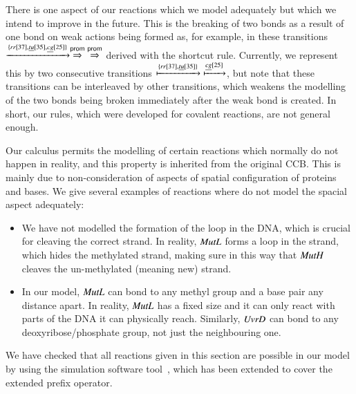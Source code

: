 There is one aspect of our reactions which we model adequately but which we intend to improve in the future. This is the breaking of two bonds as a result of one bond on weak actions being formed as, for example, in these transitions   $\xrightarrow{\{rr[37],\underline{tu}[35],\underline{cg}[25]\}}
\overset{ \textsf{prom}}\Rightarrow \; \overset{ \textsf{prom}}\Rightarrow$ derived with the  shortcut   rule. Currently, we represent this
by two consecutive transitions $\xmapsto{\{rr[37],\underline{tu}[35]\}}\; \xmapsto{\underline{cg}[25]}$, but note 
that these transitions can be interleaved by other transitions, which weakens the modelling of the two bonds being broken immediately after the weak bond is created. In short, our  rules, which were developed for covalent reactions, are not general enough.


Our calculus permits the modelling of certain reactions which normally do not happen in reality, and this property is inherited from the original CCB. This is mainly due to non-consideration of aspects of spatial configuration of proteins and bases. We give several examples of reactions where do not model the spacial aspect adequately: 
\begin{itemize}
\item We have not modelled the formation of the loop in the DNA, which is crucial for cleaving the correct strand. In reality, 
$\mathit{MutL}$ forms a loop in the strand, which hides the methylated strand, making sure in this way that $\mathit{MutH}$ cleaves the un-methylated (meaning new) strand.
\item In our model, $\mathit{MutL}$ can bond to any methyl group and a base pair any distance apart. In reality, $\mathit{MutL}$ has 
a fixed size and it can only react with parts of the DNA it can physically reach. Similarly, $\mathit{UvrD}$ can bond to any deoxyribose/phosphate group, not just the neighbouring one. 
\end{itemize}

We have checked that all reactions given in this section are possible in our model by using the simulation software tool~\cite{10.1007/978-3-319-99498-7_8}, which has been extended to cover the extended prefix operator.
